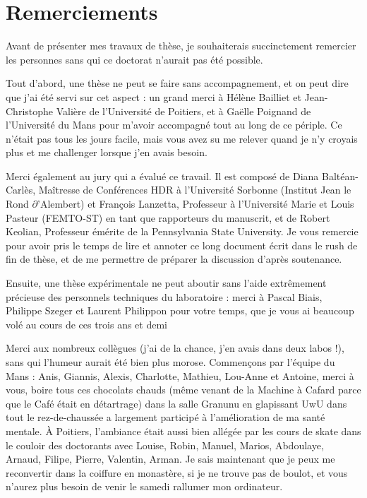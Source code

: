 \chapter*{Remerciements}\label{chap:Remerciements}

Avant de présenter mes travaux de thèse, je souhaiterais succinctement remercier les personnes sans qui ce doctorat n'aurait pas été possible.

\bigskip

Tout d'abord, une thèse ne peut se faire sans accompagnement, et on peut dire que j'ai été servi sur cet aspect : un grand merci à Hélène Bailliet et Jean-Christophe Valière de l'Université de Poitiers, et à Gaëlle Poignand de l'Université du Mans pour m'avoir accompagné tout au long de ce périple. Ce n'était pas tous les jours facile, mais vous avez su me relever quand je n'y croyais plus et me challenger lorsque j'en avais besoin.

\medskip

Merci également au jury qui a évalué ce travail. Il est composé de Diana Baltéan-Carlès, Maîtresse de Conférences HDR à l'Université Sorbonne (Institut Jean le Rond $\partial$'Alembert) et François Lanzetta, Professeur  à l'Université Marie et Louis Pasteur (FEMTO-ST) en tant que rapporteurs du manuscrit, et de Robert Keolian, Professeur émérite de la Pennsylvania State University. Je vous remercie pour avoir pris le temps de lire et annoter ce long document écrit dans le rush de fin de thèse, et de me permettre de préparer la discussion d'après soutenance.

\medskip

Ensuite, une thèse expérimentale ne peut aboutir sans l'aide extrêmement précieuse des personnels techniques du laboratoire : merci à Pascal Biais, Philippe Szeger et Laurent Philippon pour votre temps, que je vous ai beaucoup volé au cours de ces trois ans et demi

\bigskip

Merci aux nombreux collègues (j'ai de la chance, j'en avais dans deux labos !), sans qui l'humeur aurait été bien plus morose. Commençons par l'équipe du Mans : Anis, Giannis, Alexis, Charlotte, Mathieu, Lou-Anne et Antoine, merci à vous, boire tous ces chocolats chauds (même venant de la Machine à Cafard\textss\texttrademark{} parce que le Café\textss\textcopyright{} était en détartrage) dans la salle Granunu en glapissant \og UwU \fg dans tout le rez-de-chaussée a largement participé à l'amélioration de ma santé mentale. À Poitiers, l'ambiance était aussi bien allégée par les cours de skate dans le couloir des doctorants avec Louise, Robin, Manuel, Marios, Abdoulaye, Arnaud, Filipe, Pierre, Valentin, Arman. Je  sais maintenant que je peux me reconvertir dans la coiffure en monastère, si je ne trouve pas de boulot, et vous n'aurez plus besoin de venir le samedi rallumer mon ordinateur. 


